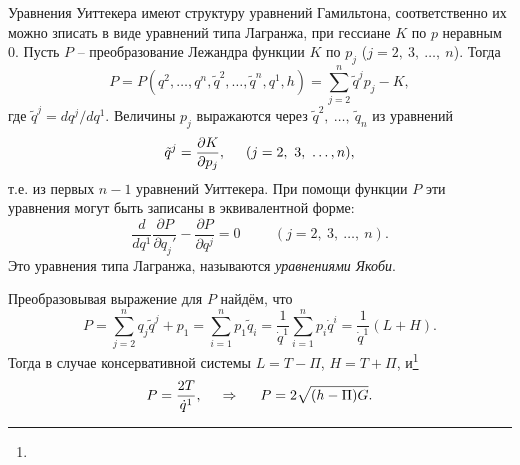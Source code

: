 Уравнения Уиттекера имеют структуру уравнений Гамильтона, соответственно их можно зписать в виде уравнений типа Лагранжа, при гессиане $K$ по $p$ неравным 0. Пусть $P$ -- преобразование Лежандра функции $K$ по $p_j$ ($j = 2, \ 3,\ \ldots,\ n$). Тогда
\begin{equation*}
    P = P(q^2, \ldots, q^n, \tilde q^2, \ldots, \tilde q^n, q^1, h) = \sum_{j = 2}^{n} \tilde q^j p_j - K,
\end{equation*}
где $\tilde q^{j} = d q^j / d q^1$. Величины $p_j$ выражаются через $\tilde q^2, \ \ldots, \ \tilde q_n$ из уравнений 
\begin{equation*}
    \tilde q^j = \frac{\partial K}{\partial p_j}, \hspace{0.5cm} 
    (j = 2, \ 3, \ \ldots, n),
\end{equation*}
т.е. из первых $n-1$ уравнений Уиттекера. При помощи функции $P$ эти уравнения могут быть записаны в эквивалентной форме:
\begin{equation*}
    \frac{d }{d q^1} \frac{\partial P}{\partial q_j'} - \frac{\partial P}{\partial q^j} = 0
    \hspace{1cm} (j = 2,\ 3,\ \ldots,\ n).
\end{equation*}
Это уравнения типа Лагранжа, называются \textit{уравнениями Якоби}.

Преобразовывая выражение для $P$ найдём, что
\begin{equation*}
    P = \sum_{j=2}^{n} q_j \tilde q^j + p_1 = 
    \sum_{i=1}^{n} p_1 \tilde q_i = \frac{1}{\dot{q}^1} \sum_{i=1}^{n} p_i \dot{q}^i = \frac{1}{\dot{q}^1} (L+H).
\end{equation*}
Тогда в случае консервативной системы $L = T - \Pi$, $H = T + \Pi$, и\footnote{
}
\begin{equation*}
    P = \frac{2T}{\dot{q}^1},
    \hspace{0.5cm} \Rightarrow \hspace{0.5cm} 
    P = 2 \sqrt{(h-\Pi) G}.
\end{equation*}

